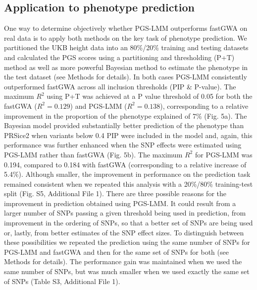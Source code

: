 \documentclass[doublespacing]{bmcart}
\begin{document}
\subsection*{Application to phenotype prediction }
One way to determine objectively whether PGS-LMM outperforms fastGWA on real data is to apply both methods on the key task of phenotype prediction. We partitioned the UKB height data into an 80\%/20\% training and testing datasets and calculated the PGS scores using a partitioning and thresholding (P+T) method as well as more powerful Bayesian method to estimate the phenotype in the test dataset (see Methods for details).  In both cases PGS-LMM consistently outperformed fastGWA across all inclusion thresholds (PIP \& P-value).  The maximum $R^2$ using P+T was achieved at a P value threshold of 0.05 for both the fastGWA ($R^2= 0.129$) and PGS-LMM ($R^2= 0.138$), corresponding to a relative improvement in the proportion of the phenotype explained of 7\% (Fig. 5a). The Bayesian model provided substantially better prediction of the phenotype than PRSice2 when variants below 0.4 PIP were included in the model and, again, this performance was further enhanced when the SNP effects were estimated using PGS-LMM rather than fastGWA (Fig. 5b). The maximum $R^2$ for PGS-LMM was 0.194, compared to 0.184 with fastGWA (corresponding to a relative increase of 5.4\%). Although smaller, the improvement in performance on the prediction task remained consistent when we repeated this analysis with a 20\%/80\% training-test split (Fig. S5, Additional File 1). There are three possible reasons for the improvement in prediction obtained using PGS-LMM. It could result from a larger number of SNPs passing a given threshold being used in prediction, from improvement in the ordering of SNPs, so that a better set of SNPs are being used or, lastly, from better estimates of the SNP effect sizes. To distinguish between these possibilities we repeated the prediction using the same number of SNPs for PGS-LMM and fastGWA and then for the same set of SNPs for both (see Methods for details). The performance gain was maintained when we used the same number of SNPs, but was much smaller when we used exactly the same set of SNPs (Table S3, Additional File 1). 
\end{document}
